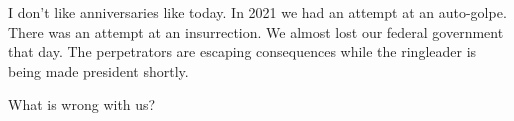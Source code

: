 I don't like anniversaries like today.  In 2021 we had an attempt at an auto-golpe.  There was an attempt at an insurrection.  We almost lost our federal government that day.  The perpetrators are escaping consequences while the ringleader is being made president shortly.

What is wrong with us?
